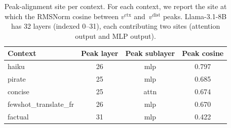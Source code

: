 \begin{table}[t]
\centering
\caption{Peak-alignment site per context. For each context, we report the
site at which the RMSNorm cosine between $v^\text{ctx}$ and~$v^\text{dist}$
peaks. Llama-3.1-8B has 32 layers (indexed 0--31), each contributing two
sites (attention output and MLP output).}
\label{tab:peak}
\begin{tabular}{lccc}
\toprule
Context & Peak layer & Peak sublayer & Peak cosine \\
\midrule
haiku                  & 26   & mlp  & 0.797 \\
pirate                 & 25   & mlp  & 0.685 \\
concise                & 25   & attn & 0.674 \\
fewshot\_translate\_fr & 26   & mlp  & 0.670 \\
factual                & 31   & mlp  & 0.422 \\
\bottomrule
\end{tabular}
\end{table}
